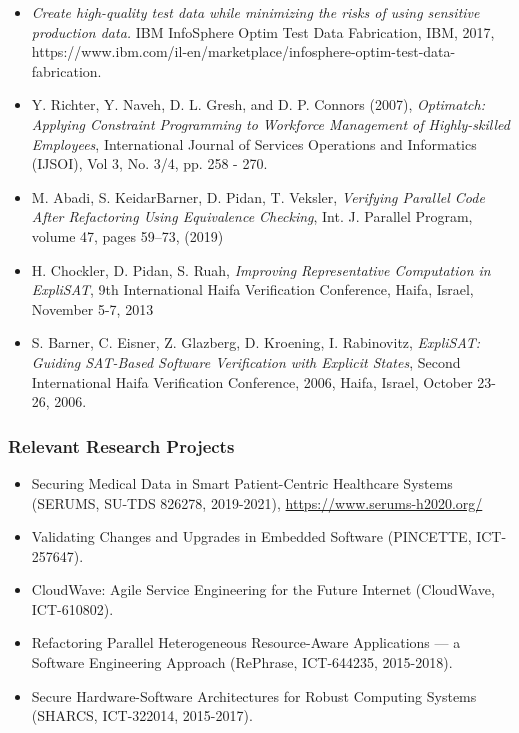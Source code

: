 \documentclass[a4paper,11pt]{article}
\begin{document}
\begin{itemize}

\item
\emph{Create high-quality test data while minimizing the risks of using sensitive production data.} IBM InfoSphere Optim Test Data Fabrication, IBM, 2017, https://www.ibm.com/il-en/marketplace/infosphere-optim-test-data-fabrication.
\item
Y. Richter, Y. Naveh, D. L. Gresh, and D. P. Connors (2007), \emph{Optimatch: Applying Constraint Programming to Workforce Management of Highly-skilled Employees}, International Journal of Services Operations and Informatics (IJSOI), Vol 3, No. 3/4, pp. 258 - 270.
\item
M. Abadi, S. Keidar\-Barner, D. Pidan, T. Veksler, \emph{Verifying Parallel Code After Refactoring Using Equivalence Checking}, Int. J. Parallel Program, volume 47, pages 59--73, (2019)
\item
H. Chockler, D. Pidan, S. Ruah, \emph{Improving Representative Computation in ExpliSAT}, 9th International Haifa Verification Conference, Haifa, Israel, November 5-7, 2013
\item
S. Barner, C. Eisner, Z. Glazberg, D. Kroening, I. Rabinovitz, \emph{ExpliSAT: Guiding SAT-Based Software Verification with Explicit States}, Second International Haifa Verification Conference, 2006, Haifa, Israel, October 23-26, 2006.
\end{itemize}

\subsubsection*{Relevant Research Projects}
\begin{itemize}
\item Securing Medical Data in Smart Patient-Centric Healthcare Systems (SERUMS, SU-TDS 826278, 2019-2021),  \url{https://www.serums-h2020.org/}
\item Validating Changes and Upgrades in Embedded Software (PINCETTE, ICT-257647).
\item
CloudWave: Agile Service Engineering for the Future Internet (CloudWave, ICT-610802).
\item
Refactoring Parallel Heterogeneous Resource-Aware Applications --- a Software Engineering Approach (RePhrase, 
ICT-644235, 2015-2018).
\item
Secure Hardware-Software Architectures for Robust Computing Systems (SHARCS, ICT-322014, 2015-2017).

\end{itemize}
\end{document}
